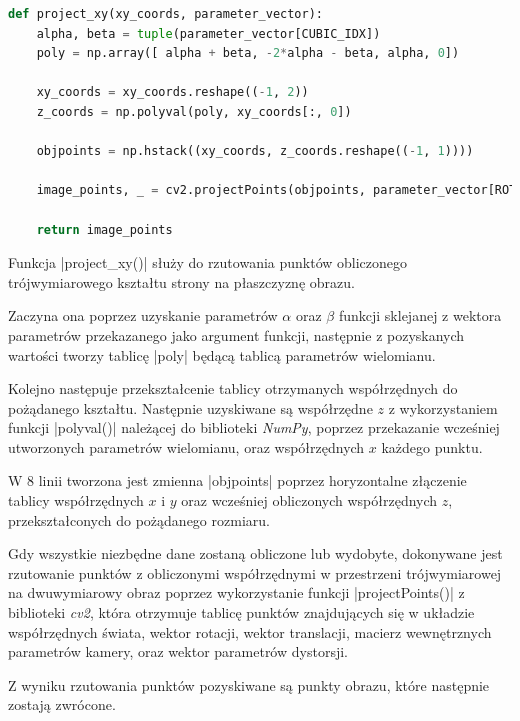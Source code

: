 \begin{lstlisting}[caption={\pyth|project_xy()| - funkcja rzutująca punkty obliczonego trójwymiarowego kształtu strony na płaszczyznę obrazu.}, label={project-xy}, language=Python]
def project_xy(xy_coords, parameter_vector):	
	alpha, beta = tuple(parameter_vector[CUBIC_IDX])
	poly = np.array([ alpha + beta, -2*alpha - beta, alpha, 0])
	
	xy_coords = xy_coords.reshape((-1, 2))
	z_coords = np.polyval(poly, xy_coords[:, 0])
	
	objpoints = np.hstack((xy_coords, z_coords.reshape((-1, 1))))
	
	image_points, _ = cv2.projectPoints(objpoints, parameter_vector[ROTATION_VECTOR_IDX], parameter_vector[TRANSLATION_VECTOR_IDX], CAMERA_MATRIX, np.zeros(5))
	
	return image_points
\end{lstlisting}

Funkcja \pyth|project_xy()| służy do rzutowania punktów obliczonego trójwymiarowego kształtu strony na płaszczyznę obrazu.

Zaczyna ona poprzez uzyskanie parametrów $\alpha$ oraz $\beta$ funkcji sklejanej z wektora parametrów przekazanego jako argument funkcji, następnie z pozyskanych wartości tworzy tablicę \pyth|poly| będącą tablicą parametrów wielomianu.

Kolejno następuje przekształcenie tablicy otrzymanych współrzędnych do pożądanego kształtu. Następnie uzyskiwane są współrzędne $z$ z wykorzystaniem funkcji \pyth|polyval()| należącej do biblioteki \textit{NumPy}, poprzez przekazanie wcześniej utworzonych parametrów wielomianu, oraz współrzędnych $x$ każdego punktu.

W 8 linii tworzona jest zmienna \pyth|objpoints| poprzez horyzontalne złączenie tablicy współrzędnych $x$ i $y$ oraz wcześniej obliczonych współrzędnych $z$, przekształconych do pożądanego rozmiaru.

Gdy wszystkie niezbędne dane zostaną obliczone lub wydobyte, dokonywane jest rzutowanie punktów z obliczonymi współrzędnymi w przestrzeni trójwymiarowej na dwuwymiarowy obraz poprzez wykorzystanie funkcji \pyth|projectPoints()| z biblioteki \textit{cv2}, która otrzymuje tablicę punktów znajdujących się w układzie współrzędnych świata, wektor rotacji, wektor translacji, macierz wewnętrznych parametrów kamery, oraz wektor parametrów dystorsji. 

Z wyniku rzutowania punktów pozyskiwane są punkty obrazu, które następnie zostają zwrócone.


